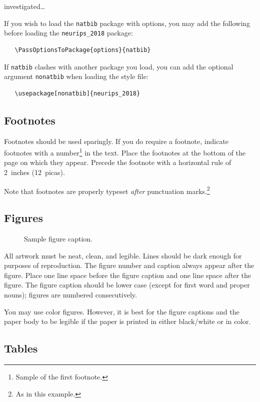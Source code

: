 \documentclass{article}
\begin{document}
  \citet{DBLP:conf/icml/CollobertW08}  investigated\dots


If you wish to load the \verb+natbib+ package with options, you may add the
following before loading the \verb+neurips_2018+ package:
\begin{verbatim}
   \PassOptionsToPackage{options}{natbib}
\end{verbatim}

If \verb+natbib+ clashes with another package you load, you can add the optional
argument \verb+nonatbib+ when loading the style file:
\begin{verbatim}
   \usepackage[nonatbib]{neurips_2018}
\end{verbatim}



\subsection{Footnotes}

Footnotes should be used sparingly.  If you do require a footnote, indicate
footnotes with a number\footnote{Sample of the first footnote.} in the
text. Place the footnotes at the bottom of the page on which they appear.
Precede the footnote with a horizontal rule of 2~inches (12~picas).

Note that footnotes are properly typeset \emph{after} punctuation
marks.\footnote{As in this example.}

\subsection{Figures}

\begin{figure}
  \centering
  \fbox{\rule[-.5cm]{0cm}{4cm} \rule[-.5cm]{4cm}{0cm}}
  \caption{Sample figure caption.}
\end{figure}

All artwork must be neat, clean, and legible. Lines should be dark enough for
purposes of reproduction. The figure number and caption always appear after the
figure. Place one line space before the figure caption and one line space after
the figure. The figure caption should be lower case (except for first word and
proper nouns); figures are numbered consecutively.

You may use color figures.  However, it is best for the figure captions and the
paper body to be legible if the paper is printed in either black/white or in
color.

\subsection{Tables}
\end{document}
